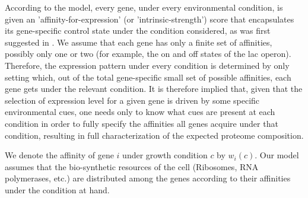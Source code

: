According to the model, every gene, under every environmental condition, is given an 'affinity-for-expression' (or 'intrinsic-strength') score that encapsulates its gene-specific control state under the condition considered, as was first suggested in \cite{Maaloe1969}.
We assume that each gene has only a finite set of affinities, possibly only one or two (for example, the on and off states of the lac operon).
Therefore, the expression pattern under every condition is determined by only setting which, out of the total gene-specific small set of possible affinities, each gene gets under the relevant condition.
It is therefore implied that, given that the selection of expression level for a given gene is driven by some specific environmental cues, one needs only to know what cues are present at each condition in order to fully specify the affinities all genes acquire under that condition, resulting in full characterization of the expected proteome composition.

We denote the affinity of gene $i$ under growth condition $c$ by $w_i(c)$.
Our model assumes that the bio-synthetic resources of the cell (Ribosomes, RNA polymerases, etc.) are distributed among the genes according to their affinities under the condition at hand.